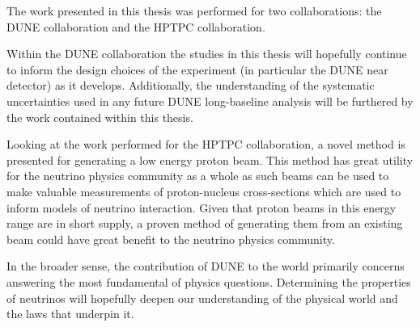 \begin{impactstatement}

The work presented in this thesis was performed for two collaborations: the DUNE collaboration and the HPTPC collaboration.

Within the DUNE collaboration the studies in this thesis will hopefully continue to inform the design choices of the experiment (in particular the DUNE near detector) as it develops. 
Additionally, the understanding of the systematic uncertainties used in any future DUNE long-baseline analysis will be furthered by the work contained within this thesis.

Looking at the work performed for the HPTPC collaboration, a novel method is presented for generating a low energy proton beam.
This method has great utility for the neutrino physics community as a whole as such beams can be used to make valuable measurements of proton-nucleus cross-sections which are used to inform models of neutrino interaction.
Given that proton beams in this energy range are in short supply, a proven method of generating them from an existing beam could have great benefit to the neutrino physics community.

In the broader sense, the contribution of DUNE to the world primarily concerns answering the most fundamental of physics questions.
Determining the properties of neutrinos will hopefully deepen our understanding of the physical world and the laws that underpin it.

\end{impactstatement}

